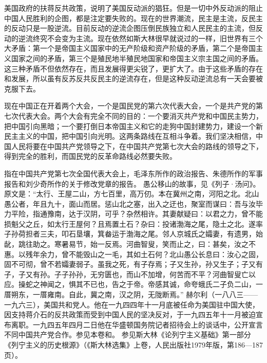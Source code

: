 美国政府的扶蒋反共政策，说明了美国反动派的猖狂。但是一切中外反动派的阻止中国人民胜利的企图，都是注定要失败的。现在的世界潮流，民主是主流，反民主的反动只是一股逆流。目前反动的逆流企图压倒民族独立和人民民主的主流，但反动的逆流终究不会变为主流。现在依然如斯大林很早就说过的一样，旧世界有三个大矛盾：第一个是帝国主义国家中的无产阶级和资产阶级的矛盾，第二个是帝国主义国家之间的矛盾，第三个是殖民地半殖民地国家和帝国主义宗主国之间的矛盾。这三种矛盾不但依然存在，而且发展得更尖锐了，更扩大了。由于这些矛盾的存在和发展，所以虽有反苏反共反民主的逆流存在，但是这种反动逆流总有一天会要被克服下去。

现在中国正在开着两个大会，一个是国民党的第六次代表大会，一个是共产党的第七次代表大会。两个大会有完全不同的目的：一个要消灭共产党和中国民主势力，把中国引向黑暗；一个要打倒日本帝国主义和它的走狗中国封建势力，建设一个新民主主义的中国，把中国引向光明。这两条路线在互相斗争着。我们坚决相信，中国人民将要在中国共产党领导之下，在中国共产党第七次大会的路线的领导之下，得到完全的胜利，而国民党的反革命路线必然要失败。


\begin{maonote}
指在中国共产党第七次全国代表大会上，毛泽东所作的政治报告、朱德所作的军事报告和刘少奇所作的关于修改党章的报告。
愚公移山的故事，见《列子·汤问》。原文是：“太行、王屋二山，方七百里，高万仞。本在冀州之南，河阳之北。北山愚公者，年且九十，面山而居。惩山北之塞，出入之迂也，聚室而谋曰：吾与汝毕力平险，指通豫南，达于汉阴，可乎？杂然相许。其妻献疑曰：以君之力，曾不能损魁父之丘，如太行王屋何？且焉置土石？杂曰：投诸渤海之尾，隐土之北。遂率子孙荷担者三夫，叩石垦壤，箕畚运于渤海之尾。邻人京城氏之孀妻，有遗男，始龀，跳往助之。寒暑易节，始一反焉。河曲智叟，笑而止之，曰：甚矣，汝之不惠。以残年余力，曾不能毁山之一毛，其如土石何？北山愚公长息曰：汝心之固，固不可彻，曾不若孀妻弱子。虽我之死，有子存焉；子又生孙，孙又生子；子又有子，子又有孙。子子孙孙，无穷匮也，而山不加增，何苦而不平？河曲智叟亡以应。操蛇之神闻之，惧其不已也，告之于帝。帝感其诚，命夸蛾氏二子负二山，一厝朔东，一厝雍南。自此，冀之南，汉之阴，无陇断焉。”
赫尔利（一八八三——一九六三），美国共和党人。他在一九四四年十一月底被任命为美国驻中国大使，因支持蒋介石的反共政策而受到中国人民的坚决反对，于一九四五年十一月被迫宣布离职。一九四五年四月二日他在华盛顿国务院记者招待会上的谈话中，公开宣言不同中国共产党合作。参见本卷和。
参见斯大林《论列宁主义基础》第一部分《列宁主义的历史根源》（《斯大林选集》上卷，人民出版社1979年版，第186—187页）。
\end{maonote}
